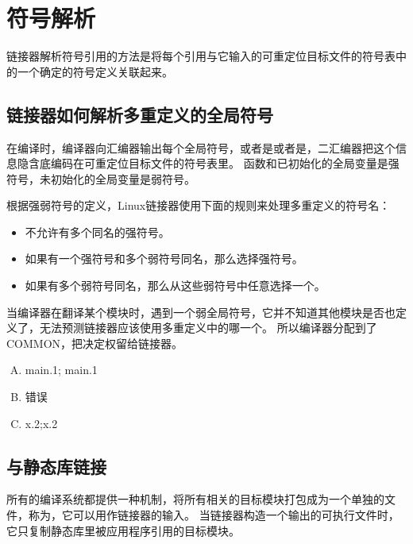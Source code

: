 
\section{符号解析}
{
    链接器解析符号引用的方法是将每个引用与它输入的可重定位目标文件的符号表中的一个确定的符号定义关联起来。

    \subsection{链接器如何解析多重定义的全局符号}
    {
        在编译时，编译器向汇编器输出每个全局符号，或者是或者是，二汇编器把这个信息隐含底编码在可重定位目标文件的符号表里。
        函数和已初始化的全局变量是强符号，未初始化的全局变量是弱符号。

        根据强弱符号的定义，Linux链接器使用下面的规则来处理多重定义的符号名：

        \begin{itemize}
            \item 不允许有多个同名的强符号。
            \item 如果有一个强符号和多个弱符号同名，那么选择强符号。
            \item 如果有多个弱符号同名，那么从这些弱符号中任意选择一个。
        \end{itemize}

        当编译器在翻译某个模块时，遇到一个弱全局符号，它并不知道其他模块是否也定义了，无法预测链接器应该使用多重定义中的哪一个。
        所以编译器分配到了COMMON，把决定权留给链接器。

        \begin{practicec}
            \begin{enumerate}[A.]
                \item main.1; main.1
                \item 错误
                \item x.2;x.2
            \end{enumerate}
        \end{practicec}
    }

    \subsection{与静态库链接}
    {
        所有的编译系统都提供一种机制，将所有相关的目标模块打包成为一个单独的文件，称为，它可以用作链接器的输入。
        当链接器构造一个输出的可执行文件时，它只复制静态库里被应用程序引用的目标模块。

}}
